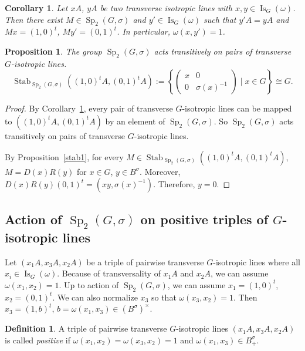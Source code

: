 \documentclass[a4paper,oneside,11pt]{amsart}
\DeclareMathOperator{\Sp}{Sp}
\DeclareMathOperator{\Stab}{Stab}
\DeclareMathOperator{\Is}{Is}
\theoremstyle{plain}
\newtheorem{cor}[teo]{Corollary}
\newtheorem{prop}[teo]{Proposition}
\theoremstyle{definition}
\newtheorem{df}[teo]{Definition}
\theoremstyle{remark}
\newcommand{\defin}{\emph}
\begin{document}
\begin{cor}\label{trans2}
Let $xA$, $yA$ be two transverse isotropic lines with $x,y\in\Is_G(\omega)$. Then there exist $M\in \Sp_2(G,\sigma)$ and $y'\in\Is_G(\omega)$ such that $y'A=yA$ and $Mx=(1,0)^t$, $My'=(0,1)^t$. In particular, $\omega(x,y')=1$.
\end{cor}

\begin{prop}\label{stab2} The group $\Sp_2(G,\sigma)$ acts transitively on pairs of transverse $G$-isotropic lines.
$$\Stab_{\Sp_2(G,\sigma)}((1,0)^tA,(0,1)^tA):=\left\{
\begin{pmatrix}
x & 0 \\
0 & \sigma(x)^{-1}
\end{pmatrix}
\mid
x\in G\right\}\cong G.$$
\end{prop}

\begin{proof} By Corollary~\ref{trans2}, every pair of transverse $G$-isotropic lines can be mapped to $((1,0)^tA,(0,1)^tA)$ by an element of $\Sp_2(G,\sigma)$. So $\Sp_2(G,\sigma)$ acts transitively on pairs of transverse $G$-isotropic lines.

By Proposition~\ref{stab1}, for every $M\in \Stab_{\Sp_2(G,\sigma)}((1,0)^tA,(0,1)^tA)$,
$M=D(x)R(y)$ for $x\in G$, $y\in B^{\sigma}$.
Moreover, $D(x)R(y)(0,1)^t=(xy,\sigma(x)^{-1})$. Therefore, $y=0$.
\end{proof}


\subsection{Action of \texorpdfstring{$\Sp_2(G,\sigma)$}{Sp2(G,sigma)} on positive triples of \texorpdfstring{$G$}{G}-isotropic lines}


Let $(x_1A,x_3A,x_2A)$ be a triple of pairwise transverse $G$-isotropic lines where all $x_i\in \Is_G(\omega)$. Because of transversality of $x_1A$ and $x_2A$, we can assume $\omega(x_1,x_2)=1$. Up to action of $\Sp_2(G,\sigma)$, we can assume $x_1=(1,0)^t$, $x_2=(0,1)^t$. We can also normalize $x_3$ so that $\omega(x_3,x_2)=1$. Then $x_3=(1,b)^t$, $b=\omega(x_1,x_3)\in (B^{\sigma})^\times$.

\begin{df}
A triple of pairwise transverse $G$-isotropic lines $(x_1A,x_3A,x_2A)$ is called \defin{positive} if $\omega(x_1,x_2)=\omega(x_3,x_2)=1$ and $\omega(x_1,x_3)\in B^{\sigma}_+$.
\end{df}
\end{document}
